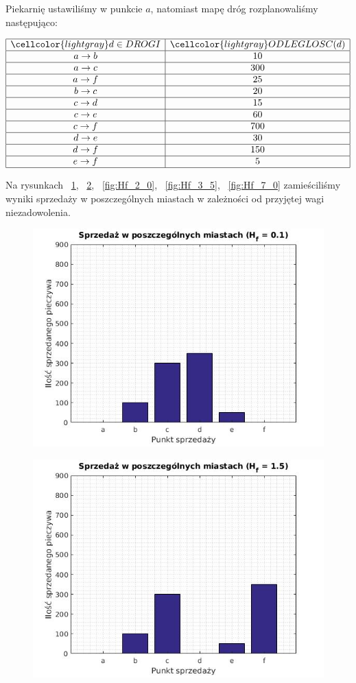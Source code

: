 \documentclass[]{article}
\begin{document}
Piekarnię ustawiliśmy w punkcie $a$, natomiast mapę dróg rozplanowaliśmy następująco:

\[
\begin{array}{|c|c|}
\hline
\cellcolor{lightgray} d \in DROGI & \cellcolor{lightgray} ODLEGLOSC(d) \\ 
\hline
a \rightarrow b & 10  \\ 
\hline
a \rightarrow c & 300  \\ 
\hline
a \rightarrow f & 25  \\
\hline
b \rightarrow c & 20  \\ 
\hline
c \rightarrow d & 15 \\ 
\hline
c \rightarrow e & 60 \\ 
\hline
c \rightarrow f & 700  \\ 
\hline
d \rightarrow e & 30  \\ 
\hline
d \rightarrow f & 150  \\ 
\hline
e \rightarrow f & 5  \\ 
\hline
\end{array} 
\]

Na rysunkach ~\ref{fig:Hf_0_1}, ~\ref{fig:Hf_1_5}, ~\ref{fig:Hf_2_0}, ~\ref{fig:Hf_3_5}, ~\ref{fig:Hf_7_0} zamieściliśmy wyniki sprzedaży w poszczególnych miastach w zależności od przyjętej wagi niezadowolenia.

\begin{figure}
	\centering
	\caption{}
	\includegraphics[width=0.7\linewidth]{Hf_0_1}
	\label{fig:Hf_0_1}
\end{figure}

\begin{figure}
	\centering
	\caption{}
	\includegraphics[width=0.7\linewidth]{Hf_1_5}
	\label{fig:Hf_1_5}
\end{figure}
\end{document}
